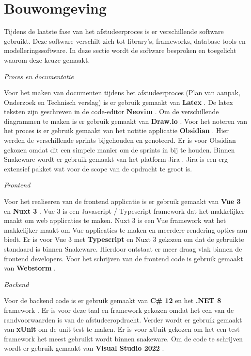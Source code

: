 \section{Bouwomgeving}
Tijdens de laatste fase van het afstudeerproces is er verschillende software gebruikt.
Deze software verschilt zich tot library's, frameworks, database tools en modelleringssoftware.
In deze sectie wordt de software besproken en toegelicht waarom deze keuze gemaakt.

\whitespace[2]
\textit{Proces en documentatie}

\whitespace[2]
Voor het maken van documenten tijdens het afstudeerproces (Plan van aanpak, Onderzoek en Technisch verslag) is er gebruik gemaakt van \textbf{Latex} \parencite{Latex}.
De latex teksten zijn geschreven in de code-editor \textbf{Neovim} \parencite{NeoVim}.
Om de verschillende diagrammen te maken is er gebruik gemaakt van \textbf{Draw.io} \parencite{Drawio}.
Voor het noteren van het proces is er gebruik gemaakt van het notitie applicatie \textbf{Obsidian} \parencite{Obsidian}.
Hier werden de verschillende sprints bijgehouden en genoteerd.
Er is voor Obsidian gekozen omdat dit een simpele manier om de sprints in bij te houden.
Binnen Snakeware wordt er gebruik gemaakt van het platform Jira \parencite{Jira}.
Jira is een erg extensief pakket wat voor de scope van de opdracht te groot is.

\whitespace[2]
\textit{Frontend}

\whitespace[2]
Voor het realiseren van de frontend applicatie is er gebruik gemaakt van \textbf{Vue 3} \parencite{Vue} en \textbf{Nuxt 3} \parencite{Nuxt}.
Vue 3 is een Javascript \parencite{JavaScript} / Typescript \parencite{Typescript} framework dat het makkelijker maakt om web applicaties te maken.
Nuxt 3 is een Vue framework wat het makkelijker maakt om Vue applicaties te maken en meerdere rendering opties aan biedt.
Er is voor Vue 3 met \textbf{Typescript} en Nuxt 3 gekozen om dat de gebruikte standaard is binnen Snakeware.
Hierdoor ontstaat er meer draag vlak binnen de frontend developers.
Voor het schrijven van de frontend code is gebruik gemaakt van \textbf{Webstorm} \parencite{Webstorm}.

\newpage

\whitespace[2]
\textit{Backend}

\whitespace[2]
Voor de backend code is er gebruik gemaakt van \textbf{C\# 12} \parencite{CSharp} en het \textbf{.NET 8} framework \parencite{DotNet8}.
Er is voor deze taal en framework gekozen omdat het een van de randvoorwaarden is van de afstudeeropdracht.
Verder wordt er gebruik gemaakt van \textbf{xUnit} \parencite{xUnit} om de unit test te maken.
Er is voor xUnit gekozen om het een test-framework het meest gebruikt wordt binnen snakeware.
Om de code te schrijven wordt er gebruik gemaakt van \textbf{Visual Studio 2022} \parencite{VisualStudio}.

